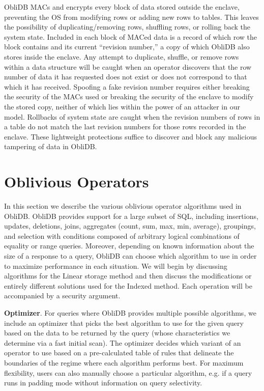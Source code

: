 \documentclass[letterpaper,twocolumn,10pt]{article}
\def\name/{ObliDB}
\begin{document}
\name/ MACs and encrypts every block of data stored outside the enclave, preventing the OS from modifying rows or adding new rows to tables. This leaves the possibility of duplicating/removing rows, shuffling rows, or rolling back the system state. Included in each block of MACed data is a record of which row the block contains and its current ``revision number,'' a copy of which \name/ also stores inside the enclave. Any attempt to duplicate, shuffle, or remove rows within a data structure will be caught when an operator discovers that the row number of data it has requested does not exist or does not correspond to that which it has received. Spoofing a fake revision number requires either breaking the security of the MACs used or breaking the security of the enclave to modify the stored copy, neither of which lies within the power of an attacker in our model. Rollbacks of system state are caught when the revision numbers of rows in a table do not match the last revision numbers for those rows recorded in the enclave. These lightweight protections suffice to discover and block any malicious tampering of data in \name/.

\section{Oblivious Operators}\label{oblivOps}
In this section we describe the various oblivious operator algorithms used in \name/. \name/ provides support for a large subset of SQL, including insertions, updates, deletions, joins, aggregates (count, sum, max, min, average), groupings, and selection with conditions composed of arbitrary logical combinations of equality or range queries. Moreover, depending on known information about the size of a response to a query, \name/ can choose which algorithm to use in order to maximize performance in each situation. We will begin by discussing algorithms for the Linear storage method and then discuss the modifications or entirely different solutions used for the Indexed method. Each operation will be accompanied by a security argument.

\noindent \textbf{Optimizer}. For queries where \name/ provides multiple possible algorithms, we include an optimizer that picks the best algorithm to use for the given query based on the data to be returned by the query (whose characteristics we determine via a fast initial scan). The optimizer decides which variant of an operator to use based on a pre-calculated table of rules that delineate the boundaries of the regime where each algorithm performs best. For maximum flexibility, users can also manually choose a particular algorithm, e.g. if a query runs in padding mode without information on query selectivity.
\end{document}

